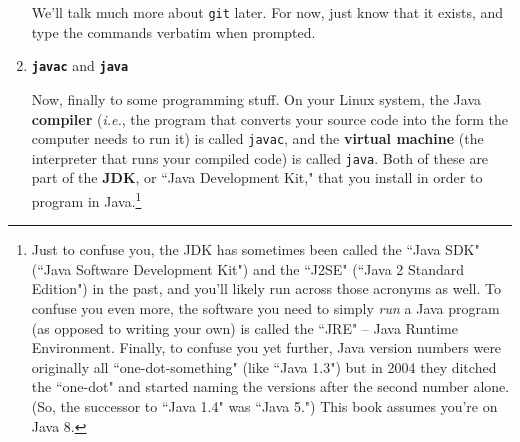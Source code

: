 \begin{enumerate}

We'll talk much more about \texttt{git} later. For now, just know that it
exists, and type the commands verbatim when prompted.

\bigline
\item \textbf{\texttt{javac}} and \textbf{\texttt{java}}

Now, finally to some programming stuff. On your Linux system, the Java
\textbf{compiler} (\textit{i.e.}, the program that converts your source code
into the form the computer needs to run it) is called \texttt{javac}, and the
\textbf{virtual machine} (the interpreter that runs your compiled code) is
called \texttt{java}. Both of these are part of the \textbf{JDK}, or ``Java
Development Kit," that you install in order to program in Java.\footnote{Just
to confuse you, the JDK has sometimes been called the ``Java SDK" (``Java
Software Development Kit") and the ``J2SE" (``Java 2 Standard Edition") in the
past, and you'll likely run across those acronyms as well. To confuse you even
more, the software you need to simply \textit{run} a Java program (as opposed
to writing your own) is called the ``JRE" -- Java Runtime Environment.
Finally, to confuse you yet further, Java version numbers were originally all
``one-dot-something" (like ``Java 1.3") but in 2004 they ditched the
``one-dot" and started naming the versions after the second number alone. (So,
the successor to ``Java 1.4" was ``Java 5.") This book assumes you're on Java
8.}



\end{enumerate}
